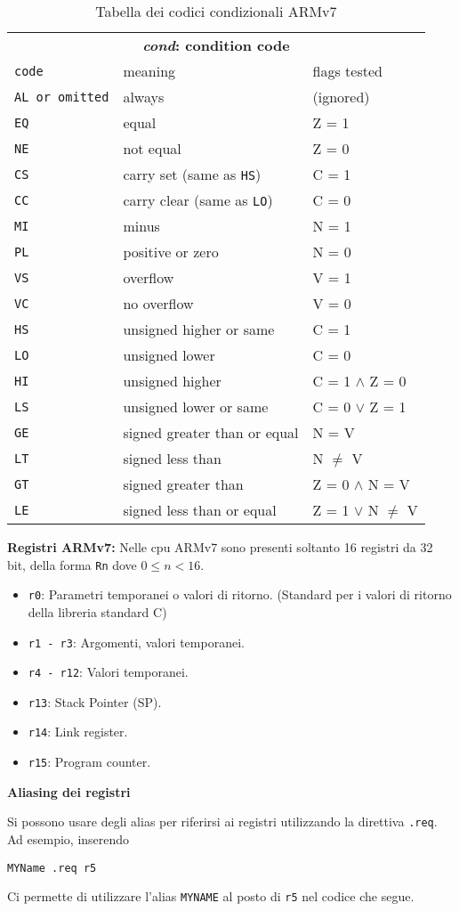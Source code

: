\def\code#1#2#3{\texttt{#1} & \small #2 & #3\\}
\begin{table}[H]
	\centering
	\caption{Tabella dei codici condizionali ARMv7}
	\begin{tabular}{l@{\hspace{5mm}}ll}
		\multicolumn{3}{c}{\bfseries \emph{cond}: condition code} \\
		\code{code}{meaning}{flags tested}
		\hline
		\code{AL \textrm{or omitted}}{always}{(ignored)}
		\code{EQ}{equal}{Z = 1}
		\code{NE}{not equal}{Z = 0}
		\code{CS}{carry set (same as \texttt{HS})}{C = 1}
		\code{CC}{carry clear (same as \texttt{LO})}{C = 0}
		\code{MI}{minus}{N = 1}
		\code{PL}{positive or zero}{N = 0}
		\code{VS}{overflow}{V = 1}
		\code{VC}{no overflow}{V = 0}
		\code{HS}{unsigned higher or same}{C = 1}
		\code{LO}{unsigned lower}{C = 0}
		\code{HI}{unsigned higher}{C = 1 $\wedge$ Z = 0}
		\code{LS}{unsigned lower or same}{C = 0 $\vee$ Z = 1}
		\code{GE}{signed greater than or equal}{N = V}
		\code{LT}{signed less than}{N $\neq$ V}
		\code{GT}{signed greater than}{Z = 0 $\wedge$ N = V}
		\code{LE}{signed less than or equal}{Z = 1 $\vee$ N $\neq$ V}\hline

	\end{tabular}
\end{table}

\begin{defn}
\textbf{Registri ARMv7:}
Nelle cpu ARMv7 sono presenti soltanto 16 registri da 32 bit, della forma \verb|Rn| dove $ 0 \leq n < 16 $.

\begin{itemize}
	\item \verb|r0|: Parametri temporanei o valori di ritorno. (Standard per i valori di ritorno della libreria standard C)
	\item \verb|r1 - r3|: Argomenti, valori temporanei.
	\item \verb|r4 - r12|: Valori temporanei.
	\item \verb|r13|: Stack Pointer (SP).
	\item \verb|r14|: Link register.
	\item \verb|r15|: Program counter.
\end{itemize}
\end{defn}


\begin{defn}
	\textbf{Aliasing dei registri}

	Si possono usare degli alias per riferirsi ai registri utilizzando la direttiva
	\verb|.req|. Ad esempio, inserendo
\begin{lstlisting}[style=arm]
	MYName .req r5
\end{lstlisting}
	Ci permette di utilizzare l'alias \verb|MYNAME| al posto di \verb|r5| nel codice che segue.
\end{defn}

